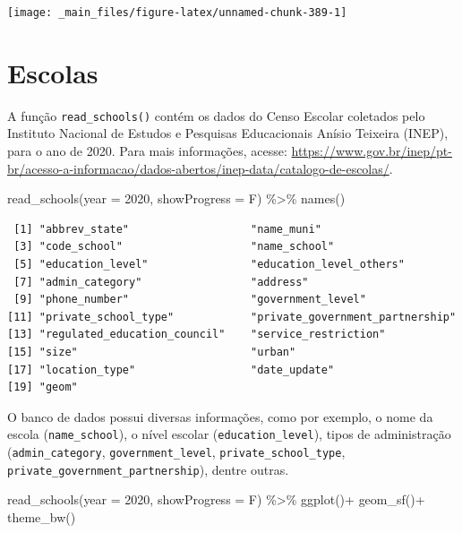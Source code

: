 \documentclass[
  brazilian,
]{book}
\newenvironment{Shaded}{\begin{snugshade}}{\end{snugshade}}
\newcommand{\AttributeTok}[1]{\textcolor[rgb]{0.77,0.63,0.00}{#1}}
\newcommand{\DecValTok}[1]{\textcolor[rgb]{0.00,0.00,0.81}{#1}}
\newcommand{\FunctionTok}[1]{\textcolor[rgb]{0.00,0.00,0.00}{#1}}
\newcommand{\NormalTok}[1]{#1}
\newcommand{\SpecialCharTok}[1]{\textcolor[rgb]{0.00,0.00,0.00}{#1}}
\begin{document}
\begin{center}\texttt{[image: \_main\_files/figure-latex/unnamed-chunk-389-1]} \end{center}

\hypertarget{escolas}{%
\section{Escolas}\label{escolas}}

A função \texttt{read\_schools()} contém os dados do Censo Escolar coletados pelo Instituto Nacional de Estudos e Pesquisas Educacionais Anísio Teixeira (INEP), para o ano de 2020. Para mais informações, acesse: \url{https://www.gov.br/inep/pt-br/acesso-a-informacao/dados-abertos/inep-data/catalogo-de-escolas/}.

\begin{Shaded}
\begin{Highlighting}[]
\FunctionTok{read\_schools}\NormalTok{(}\AttributeTok{year =} \DecValTok{2020}\NormalTok{,}
             \AttributeTok{showProgress =}\NormalTok{ F) }\SpecialCharTok{\%\textgreater{}\%} \FunctionTok{names}\NormalTok{()}
\end{Highlighting}
\end{Shaded}

\begin{verbatim}
 [1] "abbrev_state"                   "name_muni"                     
 [3] "code_school"                    "name_school"                   
 [5] "education_level"                "education_level_others"        
 [7] "admin_category"                 "address"                       
 [9] "phone_number"                   "government_level"              
[11] "private_school_type"            "private_government_partnership"
[13] "regulated_education_council"    "service_restriction"           
[15] "size"                           "urban"                         
[17] "location_type"                  "date_update"                   
[19] "geom"                          
\end{verbatim}

O banco de dados possui diversas informações, como por exemplo, o nome da escola (\texttt{name\_school}), o nível escolar (\texttt{education\_level}), tipos de administração (\texttt{admin\_category}, \texttt{government\_level}, \texttt{private\_school\_type}, \texttt{private\_government\_partnership}), dentre outras.

\begin{Shaded}
\begin{Highlighting}[]
\FunctionTok{read\_schools}\NormalTok{(}\AttributeTok{year =} \DecValTok{2020}\NormalTok{,}
             \AttributeTok{showProgress =}\NormalTok{ F) }\SpecialCharTok{\%\textgreater{}\%}
  \FunctionTok{ggplot}\NormalTok{()}\SpecialCharTok{+}
  \FunctionTok{geom\_sf}\NormalTok{()}\SpecialCharTok{+}
  \FunctionTok{theme\_bw}\NormalTok{()}
\end{Highlighting}
\end{Shaded}
\end{document}
